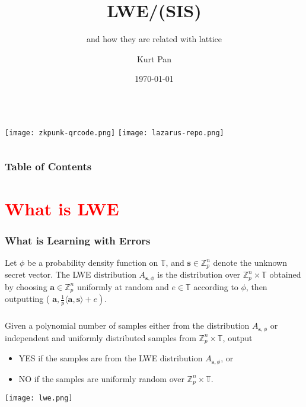 \documentclass{beamer}
\title{LWE/(SIS)}
\subtitle{and how they are related with lattice}
\author{Kurt Pan}
\institute{\url{ZKPunk.pro}}
\date{\today}
\begin{document}
\begin{frame}
	\titlepage 
	\begin{columns}
	\centering
	\texttt{[image: zkpunk-qrcode.png]}
    \centering
    \texttt{[image: lazarus-repo.png]}
 \end{columns}

\end{frame}
  
      	
  

\begin{frame}
\frametitle{Table of Contents}
\tableofcontents
\end{frame}

\section{\textcolor{red}{What is LWE}}

\begin{frame}
	\frametitle{What is Learning with Errors}
	\begin{definition}
		Let $\phi$ be a probability density function on $\mathbb{T}$, and $\mathbf{s} \in \mathbb{Z}_p^n$ denote the unknown secret vector. The LWE distribution $A_{\mathbf{s}, \phi}$ is the distribution over $\mathbb{Z}_p^n \times \mathbb{T}$ obtained by choosing $\mathbf{a} \in \mathbb{Z}_p^n$ uniformly at random and $e \in \mathbb{T}$ according to $\phi$, then outputting ( $\left.\mathbf{a}, \frac{1}{p}\langle\mathbf{a}, \mathbf{s}\rangle+e\right)$.
	\end{definition}

\end{frame}

\begin{frame}
	\frametitle{}

	\begin{definition}
	 Given a polynomial number of samples either from the distribution $A_{\mathbf{s}, \phi}$ or independent and uniformly distributed samples from $\mathbb{Z}_p^n \times \mathbb{T}$, output
	 \begin{itemize}
	 	\item YES if the samples are from the LWE distribution $A_{\mathbf{s}, \phi}$, or
	 	\item NO if the samples are uniformly random over $\mathbb{Z}_p^n \times \mathbb{T}$.
	 \end{itemize}
	\end{definition}
	\texttt{[image: lwe.png]}
\end{frame}
\end{document}
